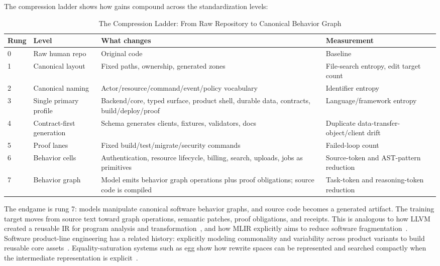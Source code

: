 The compression ladder shows how gains compound across the standardization levels:

\begin{table}[t]
\caption{The Compression Ladder: From Raw Repository to Canonical Behavior Graph}
\label{tab:ladder_compression}
\centering
\footnotesize
\begin{tabularx}{\textwidth}{p{}p{}p{}X}
\toprule
Rung & Level & What changes & Measurement \\
\midrule
0 & Raw human repo & Original code & Baseline \\
1 & Canonical layout & Fixed paths, ownership, generated zones & File-search entropy, edit target count \\
2 & Canonical naming & Actor/resource/command/event/policy vocabulary & Identifier entropy \\
3 & Single primary profile & Backend/core, typed surface, product shell, durable data, contracts, build/deploy/proof & Language/framework entropy \\
4 & Contract-first generation & Schema generates clients, fixtures, validators, docs & Duplicate data-transfer-object/client drift \\
5 & Proof lanes & Fixed build/test/migrate/security commands & Failed-loop count \\
6 & Behavior cells & Authentication, resource lifecycle, billing, search, uploads, jobs as primitives & Source-token and AST-pattern reduction \\
7 & Behavior graph & Model emits behavior graph operations plus proof obligations; source code is compiled & Task-token and reasoning-token reduction \\
\bottomrule
\end{tabularx}
\end{table}

The endgame is rung 7: models manipulate canonical software behavior graphs, and source code becomes a generated artifact. The training target moves from source text toward graph operations, semantic patches, proof obligations, and receipts. This is analogous to how LLVM created a reusable IR for program analysis and transformation~\cite{lattnerLLVM}, and how MLIR explicitly aims to reduce software fragmentation~\cite{lattnerMLIR}. Software product-line engineering has a related history: explicitly modeling commonality and variability across product variants to build reusable core assets~\cite{clementsProductLines}. Equality-saturation systems such as egg show how rewrite spaces can be represented and searched compactly when the intermediate representation is explicit~\cite{eggEgraphs}.

